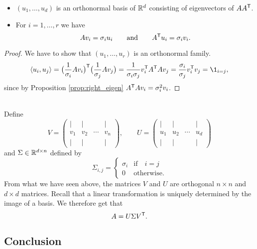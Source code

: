 \documentclass[11pt,nocut]{article}
\begin{document}
\begin{proposition}
	\begin{itemize}
		\item $(u_1, \dots, u_d)$ is an orthonormal basis of $\mathbb{R}^d$ consisting of eigenvectors of $AA^{{\sf T}}$.
		\item For $i=1, \dots, r$ we have
			$$
			A v_i = \sigma_i u_i
			\qquad \text{and} \qquad
			A^{{\sf T}} u_i = \sigma_i v_i.
			$$
	\end{itemize}
\end{proposition}
\begin{proof}
	We have to show that $(u_1, \dots, u_r)$ is an orthonormal family.
	$$
	\langle u_i, u_j \rangle = \big(\frac{1}{\sigma_i} A v_i\big)^{\sT}\big(\frac{1}{\sigma_j} A v_j\big) = \frac{1}{\sigma_i \sigma_j} v_i^{\sT} A^{\sT} A v_j
	= \frac{\sigma_i}{\sigma_j} v_i^{\sT} v_j = \1_{i = j},
	$$
	since by Proposition \ref{prop:right_eigen} $A^{{\sf T}} A v_i = \sigma_i^2 v_i$.
\end{proof}
\\

Define
$$
V = 
\begin{pmatrix}
	| & | & & | \\
	v_1 & v_2 & \cdots& v_n \\
	| & | & & |
\end{pmatrix}
,\qquad
U = 
\begin{pmatrix}
	| & | & & | \\
	u_1 & u_2 & \cdots& u_d \\
	| & | & & |
\end{pmatrix}
$$
and $\Sigma \in \mathbb{R}^{d \times n}$ defined by
$$
\Sigma_{i,j} =
\begin{cases}
	\sigma_i & \text{if} \quad i=j \\
	0 & \text{otherwise}.
\end{cases}
$$
From what we have seen above, the matrices $V$ and $U$ are orthogonal $n \times n$ and $d \times d$ matrices.
Recall that a linear transformation is uniquely determined by the image of a basis. We therefore get that
$$
A = U \Sigma V^{{\sf T}}.
$$

\subsection{Conclusion}
\end{document}
